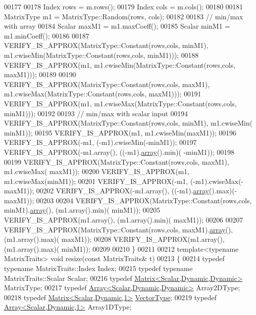 \begin{DoxyCode}
00177 
00178   Index rows = m.rows();
00179   Index cols = m.cols();
00180 
00181   MatrixType m1 = MatrixType::Random(rows, cols);
00182 
00183   \textcolor{comment}{// min/max with array}
00184   Scalar maxM1 = m1.maxCoeff();
00185   Scalar minM1 = m1.minCoeff();
00186 
00187   VERIFY\_IS\_APPROX(MatrixType::Constant(rows,cols, minM1), m1.cwiseMin(MatrixType::Constant(rows,cols, 
      minM1)));
00188   VERIFY\_IS\_APPROX(m1, m1.cwiseMin(MatrixType::Constant(rows,cols, maxM1)));
00189 
00190   VERIFY\_IS\_APPROX(MatrixType::Constant(rows,cols, maxM1), m1.cwiseMax(MatrixType::Constant(rows,cols, 
      maxM1)));
00191   VERIFY\_IS\_APPROX(m1, m1.cwiseMax(MatrixType::Constant(rows,cols, minM1)));
00192 
00193   \textcolor{comment}{// min/max with scalar input}
00194   VERIFY\_IS\_APPROX(MatrixType::Constant(rows,cols, minM1), m1.cwiseMin( minM1));
00195   VERIFY\_IS\_APPROX(m1, m1.cwiseMin(maxM1));
00196   VERIFY\_IS\_APPROX(-m1, (-m1).cwiseMin(-minM1));
00197   VERIFY\_IS\_APPROX(-m1.array(), ((-m1).\hyperlink{class_eigen_1_1array}{array}().min)( -minM1));
00198 
00199   VERIFY\_IS\_APPROX(MatrixType::Constant(rows,cols, maxM1), m1.cwiseMax( maxM1));
00200   VERIFY\_IS\_APPROX(m1, m1.cwiseMax(minM1));
00201   VERIFY\_IS\_APPROX(-m1, (-m1).cwiseMax(-maxM1));
00202   VERIFY\_IS\_APPROX(-m1.array(), ((-m1).\hyperlink{class_eigen_1_1array}{array}().max)(-maxM1));
00203 
00204   VERIFY\_IS\_APPROX(MatrixType::Constant(rows,cols, minM1).\hyperlink{class_eigen_1_1array}{array}(), (m1.array().min)( minM1));
00205   VERIFY\_IS\_APPROX(m1.array(), (m1.array().min)( maxM1));
00206 
00207   VERIFY\_IS\_APPROX(MatrixType::Constant(rows,cols, maxM1).\hyperlink{class_eigen_1_1array}{array}(), (m1.array().max)( maxM1));
00208   VERIFY\_IS\_APPROX(m1.array(), (m1.array().max)( minM1));
00209 
00210 \}
00211 
00212 \textcolor{keyword}{template}<\textcolor{keyword}{typename} MatrixTraits> \textcolor{keywordtype}{void} resize(\textcolor{keyword}{const} MatrixTraits& t)
00213 \{
00214   \textcolor{keyword}{typedef} \textcolor{keyword}{typename} MatrixTraits::Index Index;
00215   \textcolor{keyword}{typedef} \textcolor{keyword}{typename} MatrixTraits::Scalar Scalar;
00216   \textcolor{keyword}{typedef} \hyperlink{group___core___module}{Matrix<Scalar,Dynamic,Dynamic>} MatrixType;
00217   \textcolor{keyword}{typedef} \hyperlink{group___core___module_class_eigen_1_1_array}{Array<Scalar,Dynamic,Dynamic>} Array2DType;
00218   \textcolor{keyword}{typedef} \hyperlink{group___core___module}{Matrix<Scalar,Dynamic,1>} \hyperlink{struct_vector_type}{VectorType};
00219   \textcolor{keyword}{typedef} \hyperlink{group___core___module_class_eigen_1_1_array}{Array<Scalar,Dynamic,1>} Array1DType;

\end{DoxyCode}

